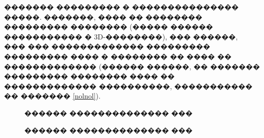 \documentclass[a4paper]{article}
\begin{document}
������� ��������� � ��������������� �����. �������, ���� �� �������� ��������� �������� (����� ������ ����������� � 3D-��������), ��� ������, ��� ��� ������������� ��������� ��������� ���� � �������� �� ���� �� ������������� (������ ������, �� ������� ��������� �������� ���� �� ������������� ����������, ����������� �� ������� \ref{nolnol}).
\begin{figure}[h]
  \vfill
  \caption{������ �������������� ���}
  \label{neustbeg}
\end{figure}
\begin{figure}[h]
  \vfill
  \caption{������ �������������� ���}
  \label{ris:image1}
\end{figure}
\end{document}
